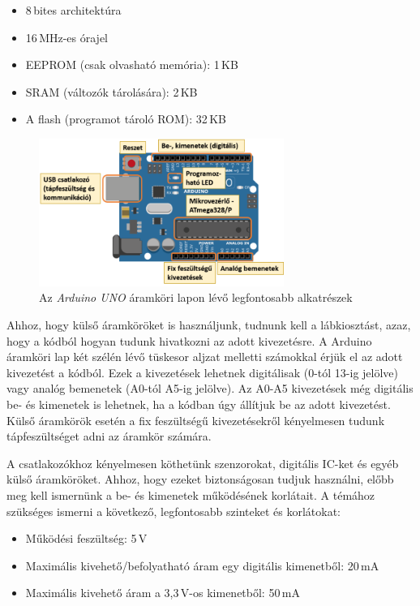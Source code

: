 \documentclass{thesis-ekf}
\theoremstyle{definition}
\begin{document}
\begin{itemize}
	\item 8\,bites architektúra
	\item 16\,MHz-es órajel
	\item EEPROM (csak olvasható memória): 1\,KB
	\item SRAM (változók tárolására): 2\,KB
	\item A flash (programot tároló ROM): 32\,KB
\end{itemize}

\begin{figure}[ht!]
	\centering
	\includegraphics[width=8cm]{arduinoUnoFelepites.png}
	\caption{Az \emph{Arduino UNO} áramköri lapon lévő legfontosabb alkatrészek}
	\label{fig-arduinoUnoFelepites}
\end{figure}

Ahhoz, hogy külső áramköröket is használjunk, tudnunk kell a lábkiosztást, azaz, hogy a kódból hogyan tudunk hivatkozni az adott kivezetésre. A Arduino áramköri lap két szélén lévő tüskesor aljzat melletti számokkal érjük el az adott kivezetést a kódból. Ezek a kivezetések lehetnek digitálisak (0-tól 13-ig jelölve) vagy analóg bemenetek (A0-tól A5-ig jelölve). Az A0-A5 kivezetések még digitális be- és kimenetek is lehetnek, ha a kódban úgy állítjuk be az adott kivezetést. Külső áramkörök esetén a fix feszültségű kivezetésekről kényelmesen tudunk tápfeszültséget adni az áramkör számára.

A csatlakozókhoz kényelmesen köthetünk szenzorokat, digitális IC-ket és egyéb külső áramköröket. Ahhoz, hogy ezeket biztonságosan tudjuk használni, előbb meg kell ismernünk a be- és kimenetek működésének korlátait. A témához szükséges ismerni a következő, legfontosabb szinteket és korlátokat:

\begin{itemize}
\item Működési feszültség: 5\,V
\item Maximális kivehető/befolyatható áram egy digitális kimenetből: 20\,mA
\item Maximális kivehető áram a 3,3\,V-os kimenetből: 50\,mA
\end{itemize}
\end{document}
